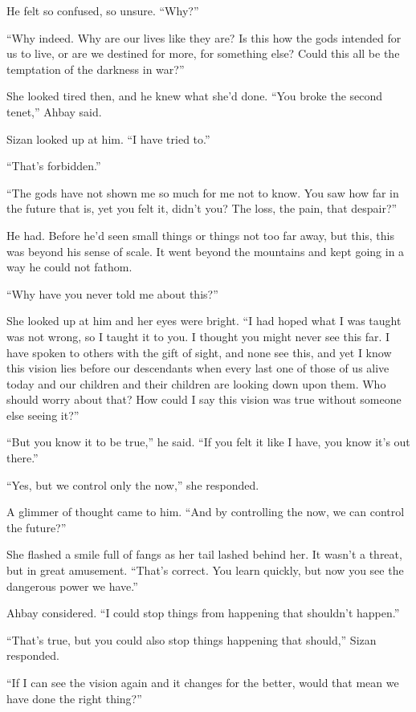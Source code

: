 He felt so confused, so unsure. ``Why?''

``Why indeed. Why are our lives like they are? Is this how the gods intended for us to live, or are we destined for more, for something else? Could this all be the temptation of the darkness in war?''

She looked tired then, and he knew what she'd done. ``You broke the second tenet,'' Ahbay said.

Sizan looked up at him. ``I have tried to.''

``That's forbidden.''

``The gods have not shown me so much for me not to know. You saw how far in the future that is, yet you felt it, didn't you? The loss, the pain, that despair?''

He had. Before he'd seen small things or things not too far away, but this, this was beyond his sense of scale. It went beyond the mountains and kept going in a way he could not fathom.

``Why have you never told me about this?''

She looked up at him and her eyes were bright. ``I had hoped what I was taught was not wrong, so I taught it to you. I thought you might never see this far. I have spoken to others with the gift of sight, and none see this, and yet I know this vision lies before our descendants when every last one of those of us alive today and our children and their children are looking down upon them. Who should worry about that? How could I say this vision was true without someone else seeing it?''

``But you know it to be true,'' he said. ``If you felt it like I have, you know it's out there.''

``Yes, but we control only the now,'' she responded.

A glimmer of thought came to him. ``And by controlling the now, we can control the future?''

She flashed a smile full of fangs as her tail lashed behind her. It wasn't a threat, but in great amusement. ``That's correct. You learn quickly, but now you see the dangerous power we have.''

Ahbay considered. ``I could stop things from happening that shouldn't happen.''

``That's true, but you could also stop things happening that should,'' Sizan responded.

``If I can see the vision again and it changes for the better, would that mean we have done the right thing?''

